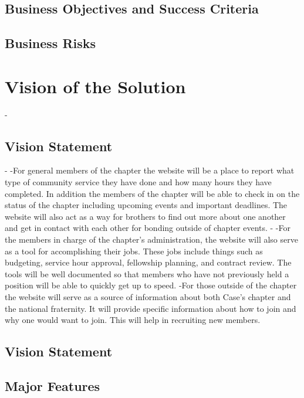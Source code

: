 \documentclass[11pt,letterpaper,rotate]{article}
\begin{document}
\subsection{Business Objectives and Success Criteria}


\subsection{Business Risks}


\section{Vision of the Solution}

	-\subsection{Vision Statement}
	-
	-For general members of the chapter the website will be a place to report what type of community service they have done and how many hours they have completed. In addition the members of the chapter will be able to check in on the status of the chapter including upcoming events and important deadlines. The website will also act as a way for brothers to find out more about one another and get in contact with each other for bonding outside of chapter events.
	-
	-For the members in charge of the chapter's administration, the website will also serve as a tool for accomplishing their jobs. These jobs include things such as budgeting, service hour approval, fellowship planning, and contract review. The tools will be well documented so that members who have not previously held a position will be able to quickly get up to speed.
	-For those outside of the chapter the website will serve as a source of information about both Case's chapter and the national fraternity. It will provide specific information about how to join and why one would want to join. This will help in recruiting new members.


\subsection{Vision Statement}


\subsection{Major Features}
\end{document}
